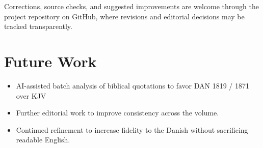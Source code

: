 Corrections, source checks, and suggested improvements are welcome through the project repository on GitHub, where revisions and editorial decisions may be tracked transparently.


\section*{Future Work}

\begin{itemize}
  \item AI-assisted batch analysis of biblical quotations to favor DAN 1819 / 1871 over KJV
  \item Further editorial work to improve consistency across the volume.
  \item Continued refinement to increase fidelity to the Danish without sacrificing readable English.
\end{itemize}
